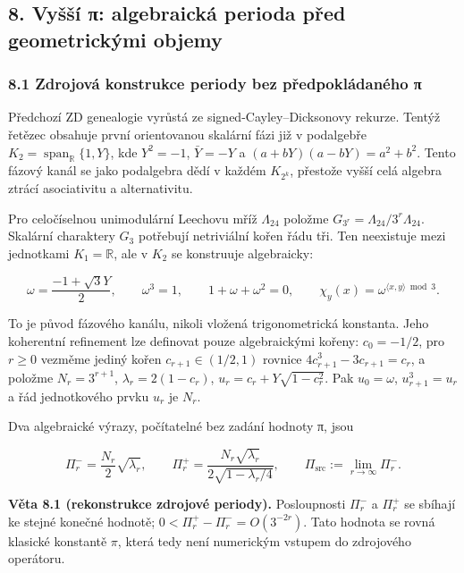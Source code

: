\documentclass[
  10pt,
]{article}
\begin{document}
\subsection{8. Vyšší π: algebraická perioda před geometrickými
objemy}\label{vyux161ux161uxed-ux3c0-algebraickuxe1-perioda-pux159ed-geometrickuxfdmi-objemy}

\subsubsection{8.1 Zdrojová konstrukce periody bez předpokládaného
π}\label{zdrojovuxe1-konstrukce-periody-bez-pux159edpokluxe1danuxe9ho-ux3c0}

Předchozí ZD genealogie vyrůstá ze signed-Cayley--Dicksonovy rekurze.
Tentýž řetězec obsahuje první orientovanou skalární fázi již v
podalgebře \(K_2=\operatorname{span}_{\mathbb R}\{1,Y\}\), kde
\(Y^2=-1\), \(\bar Y=-Y\) a \((a+bY)(a-bY)=a^2+b^2\). Tento fázový kanál
se jako podalgebra dědí v každém \(K_{2^k}\), přestože vyšší celá
algebra ztrácí asociativitu a alternativitu.

Pro celočíselnou unimodulární Leechovu mříž \(\Lambda_{24}\) položme
\(G_{3^r}=\Lambda_{24}/3^r\Lambda_{24}\). Skalární charaktery \(G_3\)
potřebují netriviální kořen řádu tři. Ten neexistuje mezi jednotkami
\(K_1=\mathbb R\), ale v \(K_2\) se konstruuje algebraicky:

\[
\omega=\frac{-1+\sqrt3Y}{2},\qquad \omega^3=1,\qquad 1+\omega+\omega^2=0,\qquad \chi_y(x)=\omega^{\langle x,y\rangle\bmod3}.
\tag{15a}
\]

To je původ fázového kanálu, nikoli vložená trigonometrická konstanta.
Jeho koherentní refinement lze definovat pouze algebraickými kořeny:
\(c_0=-1/2\), pro \(r\ge0\) vezměme jediný kořen \(c_{r+1}\in(1/2,1)\)
rovnice \(4c_{r+1}^3-3c_{r+1}=c_r\), a položme \(N_r=3^{r+1}\),
\(\lambda_r=2(1-c_r)\), \(u_r=c_r+Y\sqrt{1-c_r^2}\). Pak \(u_0=\omega\),
\(u_{r+1}^3=u_r\) a řád jednotkového prvku \(u_r\) je \(N_r\).

Dva algebraické výrazy, počítatelné bez zadání hodnoty π, jsou

\[
\Pi_r^-=\frac{N_r}{2}\sqrt{\lambda_r},\qquad
\Pi_r^+=\frac{N_r\sqrt{\lambda_r}}{2\sqrt{1-\lambda_r/4}},\qquad
\boxed{\Pi_{\mathrm{src}}:=\lim_{r\to\infty}\Pi_r^-}.\tag{15b}
\]

\textbf{Věta 8.1 (rekonstrukce zdrojové periody).} Posloupnosti
\(\Pi_r^-\) a \(\Pi_r^+\) se sbíhají ke stejné konečné hodnotě;
\(0<\Pi_r^+-\Pi_r^-=O(3^{-2r})\). Tato hodnota se rovná klasické
konstantě \(\pi\), která tedy není numerickým vstupem do zdrojového
operátoru.
\end{document}
